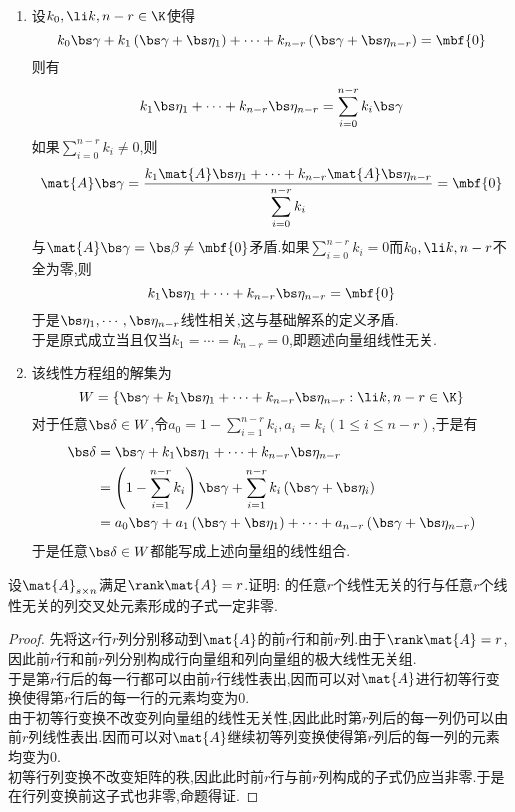 \documentclass{ctexart}
\begin{document}
\begin{solution}
\begin{enumerate}
    \item 设$k_0,\li k,{n-r}\in\K$使得
        \[k_0\bs\gamma+k_1\left(\bs\gamma+\bs\eta_1\right)+\cdots+k_{n-r}\left(\bs\gamma+\bs\eta_{n-r}\right)=\mbf{0}\]
        则有
        \[k_1\bs\eta_1+\cdots+k_{n-r}\bs\eta_{n-r}=\sum_{i=0}^{n-r}k_i\bs\gamma\]
        如果$\displaystyle\sum_{i=0}^{n-r}k_i\neq0$,则
        \[\mat{A}\bs\gamma=\dfrac{k_1\mat{A}\bs\eta_1+\cdots+k_{n-r}\mat{A}\bs\eta_{n-r}}{\displaystyle\sum_{i=0}^{n-r}k_i}=\mbf{0}\]
        与$\mat{A}\bs\gamma=\bs\beta\neq\mbf{0}$矛盾.如果$\displaystyle\sum_{i=0}^{n-r}k_i=0$而$k_0,\li k,{n-r}$不全为零,则
        \[k_1\bs\eta_1+\cdots+k_{n-r}\bs\eta_{n-r}=\mbf{0}\]
        于是$\bs\eta_1,\cdots,\bs\eta_{n-r}$线性相关,这与基础解系的定义矛盾.\\
        于是原式成立当且仅当$k_1=\cdots=k_{n-r}=0$,即题述向量组线性无关.
    \item 该线性方程组的解集为
        \[W=\left\{\bs\gamma+k_1\bs\eta_1+\cdots+k_{n-r}\bs\eta_{n-r}:\li k,{n-r}\in\K\right\}\]
        对于任意$\bs\delta\in W$,令$a_0=\displaystyle1-\sum_{i=1}^{n-r}k_i,a_i=k_i(1\leq i\leq n-r)$,于是有
        \[\begin{aligned}
            \bs\delta
            &=\bs\gamma+k_1\bs\eta_1+\cdots+k_{n-r}\bs\eta_{n-r}\\
            &=\left(1-\sum_{i=1}^{n-r}k_i\right)\bs\gamma+\sum_{i=1}^{n-r}k_i\left(\bs\gamma+\bs\eta_i\right)\\
            &=a_0\bs\gamma+a_1\left(\bs\gamma+\bs\eta_1\right)+\cdots+a_{n-r}\left(\bs\gamma+\bs\eta_{n-r}\right)
        \end{aligned}\]
        于是任意$\bs\delta\in W$都能写成上述向量组的线性组合.
\end{enumerate}
\end{solution}
\begin{homework}[5(10')]
    设$\mat{A}_{s\times n}$满足$\rank\mat{A}=r$.证明: 的任意$r$个线性无关的行与任意$r$个线性无关的列交叉处元素形成的子式一定非零.
\end{homework}
\begin{proof}
    先将这$r$行$r$列分别移动到$\mat{A}$的前$r$行和前$r$列.由于$\rank\mat{A}=r$,因此前$r$行和前$r$列分别构成行向量组和列向量组的极大线性无关组.\\
    于是第$r$行后的每一行都可以由前$r$行线性表出,因而可以对$\mat{A}$进行初等行变换使得第$r$行后的每一行的元素均变为$0$.\\
    由于初等行变换不改变列向量组的线性无关性,因此此时第$r$列后的每一列仍可以由前$r$列线性表出.因而可以对$\mat{A}$继续初等列变换使得第$r$列后的每一列的元素均变为$0$.\\
    初等行列变换不改变矩阵的秩,因此此时前$r$行与前$r$列构成的子式仍应当非零.于是在行列变换前这子式也非零,命题得证.
\end{proof}
\end{document}
